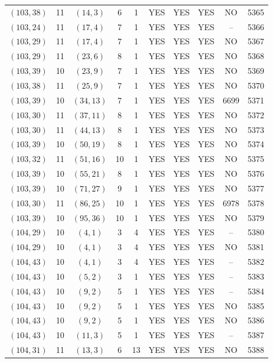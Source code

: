 \begin{longtable}{|c|c|c|c|c|c|c|c|c|c|}
$(103, 38)$ & 11 & $(14, 3)$ & 6 & 1 & YES & YES & YES & NO & 5365\\
$(103, 24)$ & 11 & $(17, 4)$ & 7 & 1 & YES & YES & YES & -- & 5366\\
$(103, 29)$ & 11 & $(17, 4)$ & 7 & 1 & YES & YES & YES & NO & 5367\\
$(103, 29)$ & 11 & $(23, 6)$ & 8 & 1 & YES & YES & YES & NO & 5368\\
$(103, 39)$ & 10 & $(23, 9)$ & 7 & 1 & YES & YES & YES & NO & 5369\\
$(103, 38)$ & 11 & $(25, 9)$ & 7 & 1 & YES & YES & YES & NO & 5370\\
$(103, 39)$ & 10 & $(34, 13)$ & 7 & 1 & YES & YES & YES & 6699 & 5371\\
$(103, 30)$ & 11 & $(37, 11)$ & 8 & 1 & YES & YES & YES & NO & 5372\\
$(103, 30)$ & 11 & $(44, 13)$ & 8 & 1 & YES & YES & YES & NO & 5373\\
$(103, 39)$ & 10 & $(50, 19)$ & 8 & 1 & YES & YES & YES & NO & 5374\\
$(103, 32)$ & 11 & $(51, 16)$ & 10 & 1 & YES & YES & YES & NO & 5375\\
$(103, 39)$ & 10 & $(55, 21)$ & 8 & 1 & YES & YES & YES & NO & 5376\\
$(103, 39)$ & 10 & $(71, 27)$ & 9 & 1 & YES & YES & YES & NO & 5377\\
$(103, 30)$ & 11 & $(86, 25)$ & 10 & 1 & YES & YES & YES & 6978 & 5378\\
$(103, 39)$ & 10 & $(95, 36)$ & 10 & 1 & YES & YES & YES & NO & 5379\\
$(104, 29)$ & 10 & $(4, 1)$ & 3 & 4 & YES & YES & YES & -- & 5380\\
$(104, 29)$ & 10 & $(4, 1)$ & 3 & 4 & YES & YES & YES & NO & 5381\\
$(104, 43)$ & 10 & $(4, 1)$ & 3 & 4 & YES & YES & YES & -- & 5382\\
$(104, 43)$ & 10 & $(5, 2)$ & 3 & 1 & YES & YES & YES & -- & 5383\\
$(104, 43)$ & 10 & $(9, 2)$ & 5 & 1 & YES & YES & YES & -- & 5384\\
$(104, 43)$ & 10 & $(9, 2)$ & 5 & 1 & YES & YES & YES & NO & 5385\\
$(104, 43)$ & 10 & $(9, 2)$ & 5 & 1 & YES & YES & YES & NO & 5386\\
$(104, 43)$ & 10 & $(11, 3)$ & 5 & 1 & YES & YES & YES & -- & 5387\\
$(104, 31)$ & 11 & $(13, 3)$ & 6 & 13 & YES & YES & YES & NO & 5388\\

\end{longtable}
